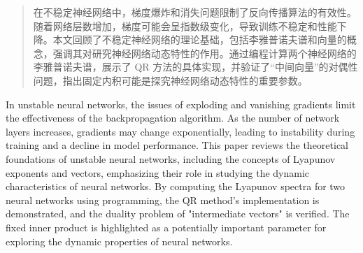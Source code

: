 

\begin{abstract}

  在不稳定神经网络中，梯度爆炸和消失问题限制了反向传播算法的有效性。随着网络层数增加，梯度可能会呈指数级变化，导致训练不稳定和性能下降。本文回顾了不稳定神经网络的理论基础，包括李雅普诺夫谱和向量的概念，强调其对研究神经网络动态特性的作用。通过编程计算两个神经网络的李雅普诺夫谱，展示了 QR 方法的具体实现，并验证了“中间向量”的对偶性问题，指出固定内积可能是探究神经网络动态特性的重要参数。
  
\end{abstract}

\begin{abstract*}
  
  In unstable neural networks, the issues of exploding and vanishing gradients limit the effectiveness of the backpropagation algorithm. As the number of network layers increases, gradients may change exponentially, leading to instability during training and a decline in model performance. This paper reviews the theoretical foundations of unstable neural networks, including the concepts of Lyapunov exponents and vectors, emphasizing their role in studying the dynamic characteristics of neural networks. By computing the Lyapunov spectra for two neural networks using programming, the QR method's implementation is demonstrated, and the duality problem of "intermediate vectors" is verified. The fixed inner product is highlighted as a potentially important parameter for exploring the dynamic properties of neural networks.
  
\end{abstract*}
